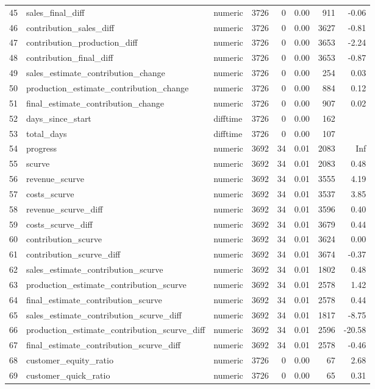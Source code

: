 \begin{sidewaystable}[ht]
\begin{tabular}{rllrrrrr}
  45 & sales\_final\_diff & numeric & 3726 &   0 & 0.00 & 911 & -0.06 \\ 
  46 & contribution\_sales\_diff & numeric & 3726 &   0 & 0.00 & 3627 & -0.81 \\ 
  47 & contribution\_production\_diff & numeric & 3726 &   0 & 0.00 & 3653 & -2.24 \\ 
  48 & contribution\_final\_diff & numeric & 3726 &   0 & 0.00 & 3653 & -0.87 \\ 
  49 & sales\_estimate\_contribution\_change & numeric & 3726 &   0 & 0.00 & 254 & 0.03 \\ 
  50 & production\_estimate\_contribution\_change & numeric & 3726 &   0 & 0.00 & 884 & 0.12 \\ 
  51 & final\_estimate\_contribution\_change & numeric & 3726 &   0 & 0.00 & 907 & 0.02 \\ 
  52 & days\_since\_start & difftime & 3726 &   0 & 0.00 & 162 &  \\ 
  53 & total\_days & difftime & 3726 &   0 & 0.00 & 107 &  \\ 
  54 & progress & numeric & 3692 &  34 & 0.01 & 2083 & Inf \\ 
  55 & scurve & numeric & 3692 &  34 & 0.01 & 2083 & 0.48 \\ 
  56 & revenue\_scurve & numeric & 3692 &  34 & 0.01 & 3555 & 4.19 \\ 
  57 & costs\_scurve & numeric & 3692 &  34 & 0.01 & 3537 & 3.85 \\ 
  58 & revenue\_scurve\_diff & numeric & 3692 &  34 & 0.01 & 3596 & 0.40 \\ 
  59 & costs\_scurve\_diff & numeric & 3692 &  34 & 0.01 & 3679 & 0.44 \\ 
  60 & contribution\_scurve & numeric & 3692 &  34 & 0.01 & 3624 & 0.00 \\ 
  61 & contribution\_scurve\_diff & numeric & 3692 &  34 & 0.01 & 3674 & -0.37 \\ 
  62 & sales\_estimate\_contribution\_scurve & numeric & 3692 &  34 & 0.01 & 1802 & 0.48 \\ 
  63 & production\_estimate\_contribution\_scurve & numeric & 3692 &  34 & 0.01 & 2578 & 1.42 \\ 
  64 & final\_estimate\_contribution\_scurve & numeric & 3692 &  34 & 0.01 & 2578 & 0.44 \\ 
  65 & sales\_estimate\_contribution\_scurve\_diff & numeric & 3692 &  34 & 0.01 & 1817 & -8.75 \\ 
  66 & production\_estimate\_contribution\_scurve\_diff & numeric & 3692 &  34 & 0.01 & 2596 & -20.58 \\ 
  67 & final\_estimate\_contribution\_scurve\_diff & numeric & 3692 &  34 & 0.01 & 2578 & -0.46 \\ 
  68 & customer\_equity\_ratio & numeric & 3726 &   0 & 0.00 &  67 & 2.68 \\ 
  69 & customer\_quick\_ratio & numeric & 3726 &   0 & 0.00 &  65 & 0.31 \\ 
   \hline
\end{tabular}
\end{sidewaystable}
